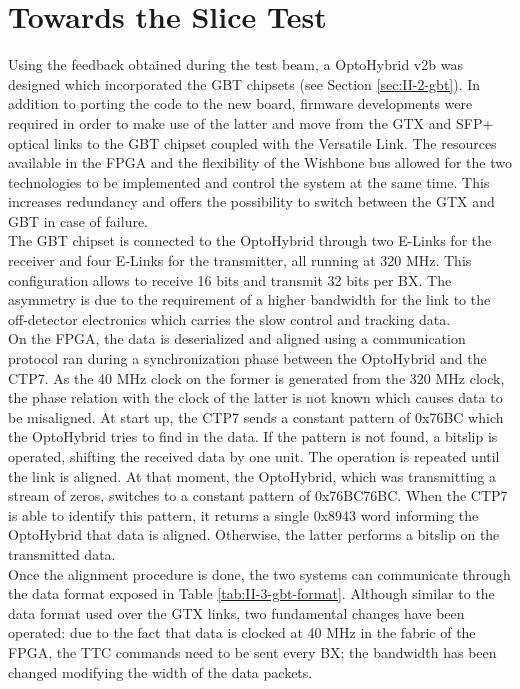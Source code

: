   \section{Towards the Slice Test}

    Using the feedback obtained during the test beam, a OptoHybrid v2b was designed which incorporated the GBT chipsets (see Section \ref{sec:II-2-gbt}). In addition to porting the code to the new board, firmware developments were required in order to make use of the latter and move from the GTX and SFP+ optical links to the GBT chipset coupled with the Versatile Link. The resources available in the FPGA and the flexibility of the Wishbone bus allowed for the two technologies to be implemented and control the system at the same time. This increases redundancy and offers the possibility to switch between the GTX and GBT in case of failure. \\

    The GBT chipset is connected to the OptoHybrid through two E-Links for the receiver and four E-Links for the transmitter, all running at 320 MHz. This configuration allows to receive 16 bits and transmit 32 bits per BX. The asymmetry is due to the requirement of a higher bandwidth for the link to the off-detector electronics which carries the slow control and tracking data. \\

    On the FPGA, the data is deserialized and aligned using a communication protocol ran during a synchronization phase between the OptoHybrid and the CTP7. As the 40 MHz clock on the former is generated from the 320 MHz clock, the phase relation with the clock of the latter is not known which causes data to be misaligned. At start up, the CTP7 sends a constant pattern of 0x76BC which the OptoHybrid tries to find in the data. If the pattern is not found, a bitslip is operated, shifting the received data by one unit. The operation is repeated until the link is aligned. At that moment, the OptoHybrid, which was transmitting a stream of zeros, switches to a constant pattern of 0x76BC76BC. When the CTP7 is able to identify this pattern, it returns a single 0x8943 word informing the OptoHybrid that data is aligned. Otherwise, the latter performs a bitslip on the transmitted data. \\

    Once the alignment procedure is done, the two systems can communicate through the data format exposed in Table \ref{tab:II-3-gbt-format}. Although similar to the data format used over the GTX links, two fundamental changes have been operated: due to the fact that data is clocked at 40 MHz in the fabric of the FPGA, the TTC commands need to be sent every BX; the bandwidth has been changed modifying the width of the data packets. \\

